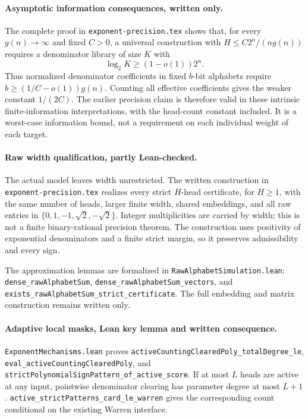 \documentclass[11pt]{article}
\begin{document}
\paragraph{Asymptotic information consequences, written only.}
The complete proof in \texttt{exponent-precision.tex} shows that, for
every $g(n)\to\infty$ and fixed $C>0$, a universal construction with
$H\leq C2^n/(n g(n))$ requires a denominator library of size $K$ with
\[
 \log_2 K\geq(1-o(1))2^n.
\]
Thus normalized denominator coefficients in fixed $b$-bit alphabets
require $b\geq(1/C-o(1))g(n)$. Counting all effective coefficients
gives the weaker constant $1/(2C)$. The earlier precision claim is
therefore valid in these intrinsic finite-information interpretations,
with the head-count constant included. It is a worst-case information
bound, not a requirement on each individual weight of each target.

\paragraph{Raw width qualification, partly Lean-checked.}
The actual model leaves width unrestricted. The written construction
in \texttt{exponent-precision.tex} realizes every strict $H$-head
certificate, for $H\geq1$, with the same number of heads, larger finite
width, shared embeddings, and all raw entries in
$\{0,1,-1,\sqrt2,-\sqrt2\}$. Integer multiplicities are carried by
width; this is not a finite binary-rational precision theorem.
The construction uses positivity of exponential denominators and a
finite strict margin, so it preserves admissibility and every sign.

The approximation lemmas are formalized in
\texttt{RawAlphabetSimulation.lean}:
\texttt{dense\_rawAlphabetSum},
\texttt{dense\_rawAlphabetSum\_vectors}, and
\texttt{exists\_rawAlphabetSum\_strict\_certificate}.
The full embedding and matrix construction remains written only.

\paragraph{Adaptive local masks, Lean key lemma and written consequence.}
\texttt{ExponentMechanisms.lean} proves
\texttt{activeCountingClearedPoly\_totalDegree\_le},
\texttt{eval\_activeCountingClearedPoly}, and
\texttt{strictPolynomialSignPattern\_of\_active\_score}.
If at most $L$ heads are active at any input, pointwise denominator
clearing has parameter degree at most $L+1$.
\texttt{active\_strictPatterns\_card\_le\_warren} gives the
corresponding count conditional on the existing Warren interface.
\end{document}
